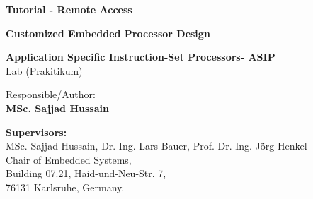 \begin{titlepage}
\thispagestyle{empty}

\begin{center}
\hbox{}
\vfill

{\usesf\large
{\huge\bfseries Tutorial - Remote Access}
\vskip 2.5cm

{\LARGE\bfseries Customized Embedded Processor Design}
\vskip 0.25cm

{\large\bfseries Application Specific Instruction-Set Processors- ASIP\\}
Lab (Prakitikum)
\vskip 1.5cm

Responsible/Author:  \\
{\large\bfseries MSc. Sajjad Hussain\\}

}
\end{center}
\vskip 3cm

\textbf{Supervisors:}  \\
{MSc. Sajjad Hussain,  Dr.-Ing. Lars Bauer, Prof. Dr.-Ing. Jörg Henkel\\}
\vskip 2cm
Chair of Embedded Systems,\\
Building 07.21, Haid-und-Neu-Str. 7, \\
76131 Karlsruhe, Germany. \\


\vfill
\end{titlepage}
